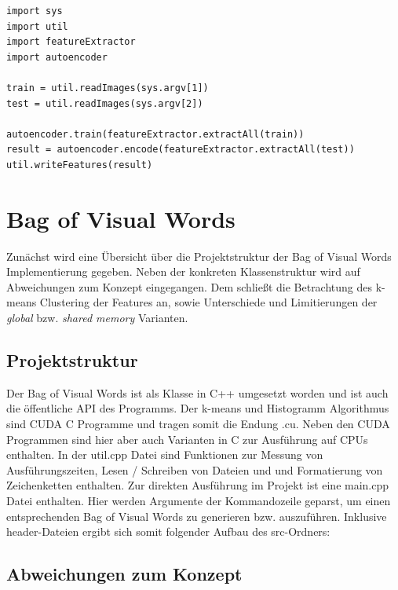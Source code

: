 \lstset{language=Python}
\begin{lstlisting}
import sys
import util
import featureExtractor
import autoencoder

train = util.readImages(sys.argv[1])
test = util.readImages(sys.argv[2])

autoencoder.train(featureExtractor.extractAll(train))
result = autoencoder.encode(featureExtractor.extractAll(test))
util.writeFeatures(result)
\end{lstlisting}

\section{Bag of Visual Words}

Zunächst wird eine Übersicht über die Projektstruktur der Bag of Visual Words Implementierung gegeben. Neben der konkreten Klassenstruktur wird auf Abweichungen zum Konzept eingegangen. Dem schließt die Betrachtung des k-means Clustering der Features an, sowie Unterschiede und Limitierungen der \textit{global} bzw. \textit{shared memory} Varianten.

\subsection{Projektstruktur}

Der Bag of Visual Words ist als Klasse in C++ umgesetzt worden und ist auch die öffentliche API des Programms. Der k-means und Histogramm Algorithmus sind CUDA C Programme und tragen somit die Endung .cu. Neben den CUDA Programmen sind hier aber auch Varianten in C zur Ausführung auf CPUs enthalten. In der util.cpp Datei sind Funktionen zur Messung von Ausführungszeiten, Lesen / Schreiben von Dateien und und Formatierung von Zeichenketten enthalten. Zur direkten Ausführung im Projekt ist eine main.cpp Datei enthalten. Hier werden Argumente der Kommandozeile geparst, um einen entsprechenden Bag of Visual Words zu generieren bzw. auszuführen. Inklusive header-Dateien ergibt sich somit folgender Aufbau des src-Ordners:

\subsection{Abweichungen zum Konzept}

